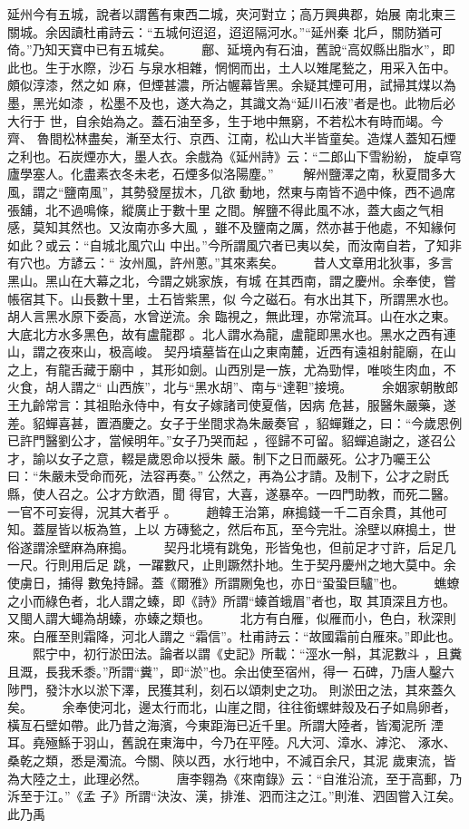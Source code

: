 \documentclass{ctexart}
\begin{document}
延州今有五城，說者以謂舊有東西二城，夾河對立；高万興典郡，始展 南北東三關城。余因讀杜甫詩云：``五城何迢迢，迢迢隔河水。''``延州秦 北戶，關防猶可倚。''乃知天寶中已有五城矣。 　　鄜、延境內有石油，舊說``高奴縣出脂水''，即此也。生于水際，沙石 与泉水相雜，惘惘而出，土人以雉尾甃之，用采入缶中。頗似淳漆，然之如 麻，但煙甚濃，所沾幄幕皆黑。余疑其煙可用，試掃其煤以為墨，黑光如漆 ，松墨不及也，遂大為之，其識文為``延川石液''者是也。此物后必大行于 世，自余始為之。蓋石油至多，生于地中無窮，不若松木有時而竭。今齊、 魯間松林盡矣，漸至太行、京西、江南，松山大半皆童矣。造煤人蓋知石煙 之利也。石炭煙亦大，墨人衣。余戲為《延州詩》云：``二郎山下雪紛紛， 旋卓穹廬學塞人。化盡素衣冬未老，石煙多似洛陽塵。'' 　　解州鹽澤之南，秋夏間多大風，謂之``鹽南風''，其勢發屋拔木，几欲 動地，然東与南皆不過中條，西不過席張舖，北不過鳴條，縱廣止于數十里 之間。解鹽不得此風不冰，蓋大鹵之气相感，莫知其然也。又汝南亦多大風 ，雖不及鹽南之厲，然亦甚于他處，不知緣何如此？或云：``自城北風穴山 中出。''今所謂風穴者已夷以矣，而汝南自若，了知非有穴也。方諺云：`` 汝州風，許州蔥。''其來素矣。 　　昔人文章用北狄事，多言黑山。黑山在大幕之北，今謂之姚家族，有城 在其西南，謂之慶州。余奉使，嘗帳宿其下。山長數十里，土石皆紫黑，似 今之磁石。有水出其下，所謂黑水也。胡人言黑水原下委高，水曾逆流。余 臨視之，無此理，亦常流耳。山在水之東。大底北方水多黑色，故有盧龍郡 。北人謂水為龍，盧龍即黑水也。黑水之西有連山，謂之夜來山，极高峻。 契丹墳墓皆在山之東南麓，近西有遠祖射龍廟，在山之上，有龍舌藏于廟中 ，其形如劍。山西別是一族，尤為勁悍，唯啖生肉血，不火食，胡人謂之`` 山西族''，北与``黑水胡''、南与``達靼''接境。 　　余姻家朝散郎王九齡常言：其祖貽永侍中，有女子嫁諸司使夏偕，因病 危甚，服醫朱嚴藥，遂差。貂蟬喜甚，置酒慶之。女子于坐間求為朱嚴奏官 ，貂蟬難之，曰：``今歲恩例已許門醫劉公才，當候明年。''女子乃哭而起 ，徑歸不可留。貂蟬追謝之，遂召公才，諭以女子之意，輟是歲恩命以授朱 嚴。制下之日而嚴死。公才乃囑王公曰：``朱嚴未受命而死，法容再奏。'' 公然之，再為公才請。及制下，公才之尉氏縣，使人召之。公才方飲酒，聞 得官，大喜，遂暴卒。一四門助教，而死二醫。一官不可妄得，況其大者乎 。 　　趙韓王治第，麻搗錢一千二百余貫，其他可知。蓋屋皆以板為笪，上以 方磚甃之，然后布瓦，至今完壯。涂壁以麻搗土，世俗遂謂涂壁麻為麻搗。 　　契丹北境有跳兔，形皆兔也，但前足才寸許，后足几一尺。行則用后足 跳，一躍數尺，止則蹶然扑地。生于契丹慶州之地大莫中。余使虜日，捕得 數兔持歸。蓋《爾雅》所謂劂兔也，亦日``蛩蛩巨驢''也。 　　蟭蟟之小而綠色者，北人謂之螓，即《詩》所謂``螓首蛾眉''者也，取 其頂深且方也。又閩人謂大蠅為胡螓，亦螓之類也。 　　北方有白雁，似雁而小，色白，秋深則來。白雁至則霜降，河北人謂之 ``霜信''。杜甫詩云：``故國霜前白雁來。''即此也。 　　熙宁中，初行淤田法。論者以謂《史記》所載：``涇水一斛，其泥數斗 ，且糞且溉，長我禾黍。''所謂``糞''，即``淤''也。余出使至宿州，得一 石碑，乃唐人鑿六陟門，發汴水以淤下澤，民獲其利，刻石以頌刺史之功。 則淤田之法，其來蓋久矣。 　　余奉使河北，邊太行而北，山崖之間，往往銜螺蚌殼及石子如鳥卵者， 橫亙石壁如帶。此乃昔之海濱，今東距海已近千里。所謂大陸者，皆濁泥所 湮耳。堯殛鯀于羽山，舊說在東海中，今乃在平陸。凡大河、漳水、滹沱、 涿水、桑乾之類，悉是濁流。今關、陝以西，水行地中，不減百余尺，其泥 歲東流，皆為大陸之土，此理必然。 　　唐李翱為《來南錄》云：``自淮沿流，至于高郵，乃泝至于江。''《孟 子》所謂``決汝、漢，排淮、泗而注之江。''則淮、泗固嘗入江矣。此乃禹 
\end{document}
